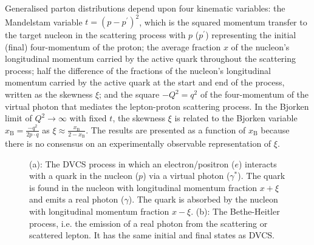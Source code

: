 Generalised parton distributions depend upon four kinematic variables: the
Mandelstam variable $t=(p-p^{\prime})^2$, which is the squared momentum
transfer to the target nucleon in the scattering process with $p$ ($p^{\prime}$)
representing the initial (final) four-momentum of the proton; the average
fraction $x$ of the nucleon's longitudinal momentum carried by the active
quark throughout the scattering process; half the difference of
  the fractions of the nucleon's longitudinal momentum carried
by the active quark at the start and end of the process, written as
the skewness $\xi$; and the square $-Q^2=q^2$ of the four-momentum of
the virtual photon that mediates the lepton-proton scattering
process. In the Bjorken limit of $Q^2\rightarrow\infty$ with fixed
$t$, the skewness $\xi$ is related to the Bjorken variable
$x_{\textrm{B}}=\frac{-q^2}{2p\cdot q}$ as
$\xi\approx\frac{x_\textrm{B}}{2-x_\textrm{B}}$. The results are presented
as a function of $x_{\textrm{B}}$ because there is no consensus on an experimentally observable representation of $\xi$. 
\begin{figure}
\begin{center}
\caption[DVCS and Bethe Heitler hand bag diagram.]{(a): The DVCS process in
which an electron/positron ($e$) interacts with a quark in the nucleon
($p$) via a virtual photon ($\gamma^\ast$). The quark is found in the
nucleon with longitudinal momentum fraction $x+\xi$ and emits a real
photon ($\gamma$). The quark is absorbed by the nucleon with
longitudinal momentum fraction
$x-\xi$. (b): The Bethe-Heitler process, i.e. the emission of a real photon from the scattering or
scattered lepton. It has the same initial and final states as DVCS.}
\label{spin}
\end{center}
\end{figure}
